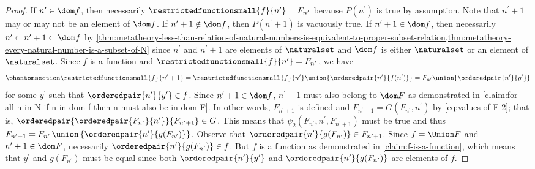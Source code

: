 \begin{proof}
    \vspace{0.3cm}
    \noindent
    If \( n^{\prime} \in \dom f \), then necessarily \( \restrictedfunctionsmall{f}{n^{\prime}} = F_{n^{\prime}} \)
    because \( P(n^{\prime}) \) is true by assumption.
    Note that \( n^{\prime} + 1 \) may or may not be an element of \( \dom f \).
    If \( n^{\prime} + 1 \notin \dom f \), then \( P(n^{\prime} + 1) \) is vacuously true.
    If \( n^{\prime} + 1 \in \dom f \), then necessarily \( n^{\prime} \subset n^{\prime} + 1 \subset \dom f \)
    by \cref{thm:metatheory-less-than-relation-of-natural-numbers-is-equivalent-to-proper-subset-relation,thm:metatheory-every-natural-number-is-a-subset-of-N}
    since \( n^{\prime} \) and \( n^{\prime} + 1 \) are elements of \( \naturalset \) and \( \dom f  \) is either \( \naturalset \) or an element of \( \naturalset \).
    Since \( f \) is a function and \( \restrictedfunctionsmall{f}{n^{\prime}} = F_{n^{\prime}} \), we have
    \begin{equation}
        \phantomsection \label{eq:f-restricted-to-n-prime-plus-one-in-union-form-2}
        \restrictedfunctionsmall{f}{n^{\prime} + 1} = \restrictedfunctionsmall{f}{n^{\prime}} \union \mleft\{ \orderedpair{n^{\prime}}{f(n^{\prime})} \mright\}
        = F_{n^{\prime}} \union \mleft\{ \orderedpair{n^{\prime}}{y^{\prime}} \mright\}
    \end{equation}
    for some \( y^{\prime} \) such that \( \orderedpair{n^{\prime}}{y^{\prime}} \in f \).
    Since \( n^{\prime} + 1 \in \dom f \), \( n^{\prime} + 1 \) must also belong to \( \dom F \)
    as demonstrated in \cref{claim:for-all-n-in-N-if-n-in-dom-f-then-n-must-also-be-in-dom-F}.
    In other words, \( F_{n^{\prime} + 1} \) is defined and
    \( F_{n^{\prime} + 1} = G(F_{n^{\prime}}, n^{\prime}) \) by \eqref{eq:values-of-F-2};
    that is, \( \orderedpair{\orderedpair{F_{n^{\prime}}}{n^{\prime}}}{F_{n^{\prime} + 1}} \in G \).
    This means that \( \psi_{2}(F_{n^{\prime}}, n^{\prime}, F_{n^{\prime} + 1}) \) must be true and thus
    \( F_{n^{\prime} + 1} = F_{n^{\prime}} \,{\union}\, \mleft\{ \orderedpair{n^{\prime}}{g(F_{n^{\prime}})} \mright\} \).
    Observe that \( \orderedpair{n^{\prime}}{g(F_{n^{\prime}})} \in F_{n^{\prime} + 1} \).
    Since \( f = \Union F \) and \( n^{\prime} + 1 \in \dom F \), necessarily \( \orderedpair{n^{\prime}}{g(F_{n^{\prime}})} \in f \).
    But \( f \) is a function as demonstrated in \cref{claim:f-is-a-function}, which means that \( y^{\prime} \) and \( g(F_{n^{\prime}}) \)
    must be equal since both \( \orderedpair{n^{\prime}}{y^{\prime}} \) and \( \orderedpair{n^{\prime}}{g(F_{n^{\prime}})} \) are elements of \( f \).

\end{proof}
